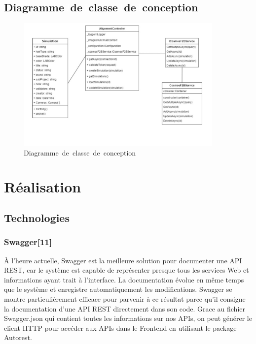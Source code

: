 \newpage
\subsection{Diagramme\textcolor{white}{J}de\textcolor{white}{J}classe\textcolor{white}{J}de\textcolor{white}{J}conception}
\begin{figure}[!ht]\centering
\includegraphics[width=0.9\textwidth,angle=00]{chapitres/chapitre4/figures/Class-Chap4.png}
\caption{Diagramme\textcolor{white}{J}de\textcolor{white}{J}classe\textcolor{white}{J}de\textcolor{white}{J}conception}
\label{fig:schemaSourcin}
\end{figure}

\section{Réalisation}

\subsection{Technologies}
\subsubsection*{Swagger[11]}
À l’heure actuelle, Swagger est la meilleure solution pour documenter une API REST, car le système est capable de représenter presque tous les services Web et informations ayant trait à l’interface. La documentation évolue en même temps que le système et enregistre automatiquement les modifications. Swagger se montre particulièrement efficace pour parvenir à ce résultat parce qu’il consigne la documentation d’une API REST directement dans son code. Grace au fichier Swagger.json qui contient toutes les informations sur nos APIs, on peut générer le client HTTP pour accéder aux APIs dans le Frontend en utilisant le package Autorest.


